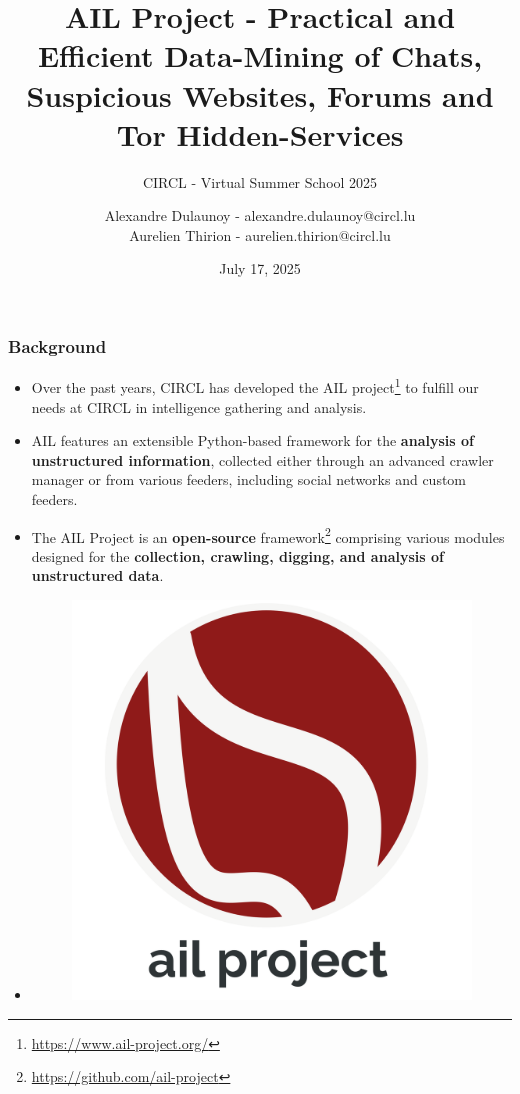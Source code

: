 \documentclass[10pt,aspectratio=169, colorlinks=true, linkcolor=circlBlue]{beamer}
\title{AIL Project - Practical and Efficient Data-Mining of Chats, Suspicious Websites, Forums and Tor Hidden-Services}
\subtitle{CIRCL - Virtual Summer School 2025}
\date{July 17, 2025}
\author{Alexandre Dulaunoy - alexandre.dulaunoy@circl.lu\\Aurelien Thirion - aurelien.thirion@circl.lu}
\institute{CIRCL \normalurl{https://www.circl.lu}}
\begin{document}



\begin{frame}
	\titlepage%
\end{frame}




\begin{frame}
    \frametitle{Background}
    \begin{itemize}
        \item Over the past years, CIRCL has developed the AIL project\footnote{\url{https://www.ail-project.org/}} to fulfill our needs at CIRCL in intelligence gathering and analysis.
        \item AIL features an extensible Python-based framework for the \textbf{analysis of unstructured information}, collected either through an advanced crawler manager or from various feeders, including social networks and custom feeders.
        \item The AIL Project is an \textbf{open-source} framework\footnote{\url{https://github.com/ail-project}} comprising various modules designed for the \textbf{collection, crawling, digging, and analysis of unstructured data}.
        \item 
            \begin{figure}
                \centering
                \includegraphics[scale=0.1]{images/ail-project.png}
            \end{figure}
    \end{itemize}
\end{frame}
\end{document}
